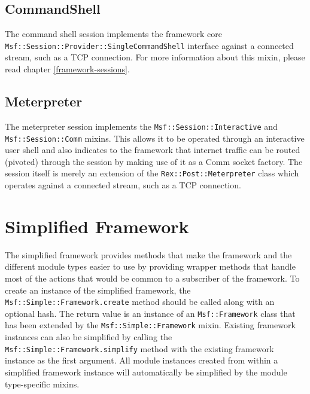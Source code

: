 \documentclass{report}
\begin{document}
        \subsection{CommandShell}

\par
The command shell session implements the framework core \\
\texttt{Msf::Session::Provider::SingleCommandShell} interface
against a connected stream, such as a TCP connection.  For more
information about this mixin, please read chapter
\ref{framework-sessions}.

        \subsection{Meterpreter}

\par
The meterpreter session implements the
\texttt{Msf::Session::Interactive} and \\
\texttt{Msf::Session::Comm}
mixins.  This allows it to be operated through an interactive user
shell and also indicates to the framework that internet traffic can
be routed (pivoted) through the session by making use of it as a
Comm socket factory.  The session itself is merely an extension of
the \texttt{Rex::Post::Meterpreter} class which operates against a
connected stream, such as a TCP connection.

    \section{Simplified Framework}

\par
The simplified framework provides methods that make the framework
and the different module types easier to use by providing wrapper
methods that handle most of the actions that would be common to a
subscriber of the framework.  To create an instance of the
simplified framework, the \texttt{Msf::Simple::Framework.create}
method should be called along with an optional hash.  The return
value is an instance of an \texttt{Msf::Framework} class that has
been extended by the \texttt{Msf::Simple::Framework} mixin. Existing
framework instances can also be simplified by calling the
\texttt{Msf::Simple::Framework.simplify} method with the existing
framework instance as the first argument.  All module instances
created from within a simplified framework instance will
automatically be simplified by the module type-specific mixins.
\end{document}
